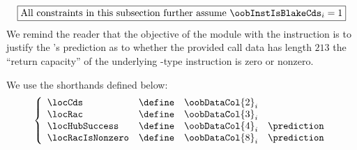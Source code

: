\[
	\boxed{\text{All constraints in this subsection further assume } \oobInstIsBlakeCds_{i} = 1}
\]
We remind the reader that the objective of the \oobMod{} module with the \oobInstBlakeCds{} instruction is to justify the \hubMod{}'s prediction as to whether
 the provided call data has length $213$
 the ``return capacity'' of the underlying -type instruction is zero or nonzero.

We use the shorthands defined below:
\[
	\left\{ \begin{array}{lclr}
		\locCds          & \define & \oobDataCol {2} _{i} \\
		\locRac          & \define & \oobDataCol {3} _{i} \\
		\locHubSuccess   & \define & \oobDataCol {4} _{i}  & \prediction \\
		\locRacIsNonzero & \define & \oobDataCol {8} _{i}  & \prediction \\
	\end{array} \right.
\]
\hubPredictionDecoratorBlurb{}

